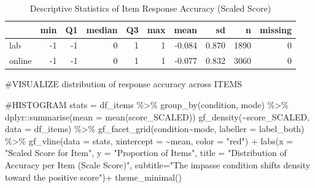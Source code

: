 \documentclass[
  letterpaper,
  DIV=11,
  numbers=noendperiod]{scrreprt}
\newenvironment{Shaded}{\begin{snugshade}}{\end{snugshade}}
\newcommand{\AttributeTok}[1]{\textcolor[rgb]{0.40,0.45,0.13}{#1}}
\newcommand{\CommentTok}[1]{\textcolor[rgb]{0.37,0.37,0.37}{#1}}
\newcommand{\FunctionTok}[1]{\textcolor[rgb]{0.28,0.35,0.67}{#1}}
\newcommand{\NormalTok}[1]{\textcolor[rgb]{0.00,0.23,0.31}{#1}}
\newcommand{\OtherTok}[1]{\textcolor[rgb]{0.00,0.23,0.31}{#1}}
\newcommand{\SpecialCharTok}[1]{\textcolor[rgb]{0.37,0.37,0.37}{#1}}
\newcommand{\StringTok}[1]{\textcolor[rgb]{0.13,0.47,0.30}{#1}}
\begin{document}
\begin{table}

\caption{Descriptive Statistics of Item Response Accuracy (Scaled Score)}
\centering
\begin{tabular}[t]{l|r|r|r|r|r|r|r|r|r}
\hline
  & min & Q1 & median & Q3 & max & mean & sd & n & missing\\
\hline
lab & -1 & -1 & 0 & 1 & 1 & -0.084 & 0.870 & 1890 & 0\\
\hline
online & -1 & -1 & 0 & 1 & 1 & -0.077 & 0.832 & 3060 & 0\\
\hline
\end{tabular}
\end{table}

\begin{Shaded}
\begin{Highlighting}[]
\CommentTok{\#VISUALIZE distribution of response accuracy across ITEMS}

\CommentTok{\#HISTOGRAM}
\NormalTok{stats }\OtherTok{=}\NormalTok{ df\_items }\SpecialCharTok{\%\textgreater{}\%} \FunctionTok{group\_by}\NormalTok{(condition, mode) }\SpecialCharTok{\%\textgreater{}\%}\NormalTok{ dplyr}\SpecialCharTok{::}\FunctionTok{summarise}\NormalTok{(}\AttributeTok{mean =} \FunctionTok{mean}\NormalTok{(score\_SCALED))}
\FunctionTok{gf\_density}\NormalTok{(}\SpecialCharTok{\textasciitilde{}}\NormalTok{score\_SCALED, }\AttributeTok{data =}\NormalTok{ df\_items) }\SpecialCharTok{\%\textgreater{}\%} 
  \FunctionTok{gf\_facet\_grid}\NormalTok{(condition}\SpecialCharTok{\textasciitilde{}}\NormalTok{mode, }\AttributeTok{labeller =}\NormalTok{ label\_both) }\SpecialCharTok{\%\textgreater{}\%} 
  \FunctionTok{gf\_vline}\NormalTok{(}\AttributeTok{data =}\NormalTok{ stats, }\AttributeTok{xintercept =} \SpecialCharTok{\textasciitilde{}}\NormalTok{mean, }\AttributeTok{color =} \StringTok{"red"}\NormalTok{) }\SpecialCharTok{+}
  \FunctionTok{labs}\NormalTok{(}\AttributeTok{x =} \StringTok{"Scaled Score for Item"}\NormalTok{,}
       \AttributeTok{y =} \StringTok{"Proportion of Items"}\NormalTok{,}
       \AttributeTok{title =} \StringTok{"Distribution of Accuracy per Item (Scale Score)"}\NormalTok{,}
       \AttributeTok{subtitle=}\StringTok{"The impasse condition shifts density toward the positive score"}\NormalTok{)}\SpecialCharTok{+}
  \FunctionTok{theme\_minimal}\NormalTok{()}
\end{Highlighting}
\end{Shaded}
\end{document}
